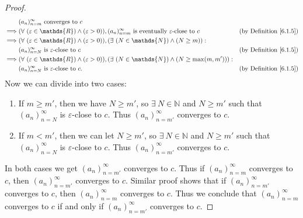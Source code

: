 \begin{proof}
\begin{align*}
& (a_n)_{n = m}^\infty \text{ converges to } c \\
\implies & (\forall\ (\varepsilon \in \mathds{R}) \land (\varepsilon > 0)), (a_n)_{n = m}^\infty \text{ is eventually } \varepsilon\text{-close to } c & \text{(by Definition \ref{6.1.5})} \\
\implies & (\forall\ (\varepsilon \in \mathds{R}) \land (\varepsilon > 0)), (\exists\ (N \in \mathds{N}) \land (N \geq m)) : \\
& (a_n)_{n = N}^\infty \text{ is } \varepsilon\text{-close to } c & \text{(by Definition \ref{6.1.5})} \\
\implies & (\forall\ (\varepsilon \in \mathds{R}) \land (\varepsilon > 0)), (\exists\ (N \in \mathds{N}) \land (N \geq \max(m, m'))) : \\
& (a_n)_{n = N}^\infty \text{ is } \varepsilon\text{-close to } c. & \text{(by Definition \ref{6.1.5})}
\end{align*}
Now we can divide into two cases:
\begin{enumerate}
    \item If \(m \geq m'\), then we have \(N \geq m'\), so \(\exists\ N \in \mathds{N}\) and \(N \geq m'\) such that \((a_n)_{n = N}^\infty\) is \(\varepsilon\)-close to \(c\).
    Thus \((a_n)_{n = m'}^\infty\) converges to \(c\).
    \item If \(m < m'\), then we can let \(N \geq m'\), so \(\exists\ N \in \mathds{N}\) and \(N \geq m'\) such that \((a_n)_{n = N}^\infty\) is \(\varepsilon\)-close to \(c\).
    Thus \((a_n)_{n = m'}^\infty\) converges to \(c\).
\end{enumerate}
In both cases we get \((a_n)_{n = m'}^\infty\) converges to \(c\).
Thus if \((a_n)_{n = m}^\infty\) converges to \(c\), then \((a_n)_{n = m'}^\infty\) converges to \(c\).
Similar proof shows that if \((a_n)_{n = m'}^\infty\) converges to \(c\), then \((a_n)_{n = m}^\infty\) converges to \(c\).
Thus we conclude that \((a_n)_{n = m}^\infty\) converges to \(c\) if and only if \((a_n)_{n = m'}^\infty\) converges to \(c\).
\end{proof}